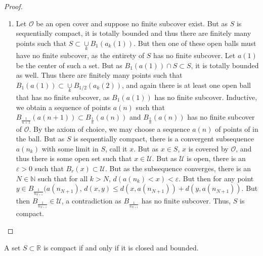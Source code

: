 \documentclass[crop=false,class=book,oneside]{standalone}
\begin{document}
\begin{proof}
\begin{enumerate}
            \item Let $\mathcal{O}$ be an open cover and suppose no finite subcover exist. But as $S$ is sequentially compact, it is totally bounded and thus there are finitely many points such that $S\subset \underset{k}\cup B_{1}(a_k(1))$. But then one of these open balls must have no finite subcover, as the entirety of $S$ has no finite subcover. Let $a(1)$ be the center of such a set. But as $B_{1}(a(1))\cap S \subset S$, it is totally bounded as well. Thus there are finitely many points such that $B_{1}(a(1))\subset \underset{k}\cup B_{1/2}(a_k(2))$, and again there is at least one open ball that has no finite subcover, as $B_{1}(a(1))$ has no finite subcover. Inductive, we obtain a sequence of points $a(n)$ such that $B_{\frac{1}{n+1}}(a(n+1))\subset B_{\frac{1}{n}}(a(n))$ and $B_{\frac{1}{n}}(a(n))$ has no finite subcover of $\mathcal{O}$. By the axiom of choice, we may choose a sequence $a(n)$ of points of in the ball. But as $S$ is sequentially compact, there is a convergent subsequence $a(n_k)$ with some limit in $S$, call it $x$. But as $x\in S$, $x$ is covered by $\mathcal{O}$, and thus there is some open set such that $x\in \mathcal{U}$. But as $\mathcal{U}$ is open, there is an $\varepsilon>0$ such that $B_{r}(x)\subset \mathcal{U}$. But as the subsequence converges, there is an $N\in \mathbb{N}$ such that for all $k>N$, $d(a(n_k)<x) < \varepsilon$. But then for any point $y\in B_{\frac{1}{n_{N+1}}}(a(n_{N+1})$, $d(x,y) \leq d(x,a(n_{N+1}))+d(y,a(n_{N+1}))$. But then $B_{\frac{1}{n_{N+1}}}\in \mathcal{U}$, a contradiction as $B_{\frac{1}{n_{N+1}}}$ has no finite subcover. Thus, $S$ is compact. 
            \end{enumerate}
            \end{proof}
            \begin{theorem}
            A set $S\subset \mathbb{R}$ is compact if and only if it is closed and bounded.
            \end{theorem}
\end{document}
